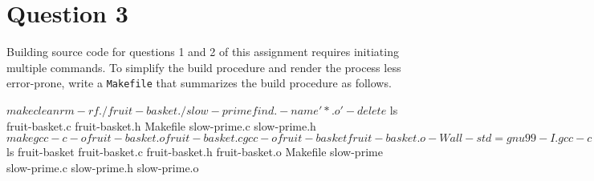 
\section*{Question 3}

Building source code for questions 1 and 2 of this assignment requires initiating multiple commands.
To simplify the build procedure and render the process less error-prone, write a \texttt{Makefile} that summarizes the build procedure as follows.

\begin{terminal}
$ make clean
rm -rf ./fruit-basket ./slow-prime
find . -name '*.o' -delete
$ ls
fruit-basket.c fruit-basket.h Makefile slow-prime.c
slow-prime.h
$ make
gcc -c -o fruit-basket.o fruit-basket.c
gcc -o fruit-basket fruit-basket.o -Wall -std=gnu99 -I.
gcc -c -o slow-prime.o slow-prime.c
gcc -o slow-prime slow-prime.o -Werror -Wall -std=gnu99 -I.
$ ls
fruit-basket fruit-basket.c fruit-basket.h fruit-basket.o
Makefile     slow-prime     slow-prime.c   slow-prime.h
slow-prime.o
\end{terminal}
